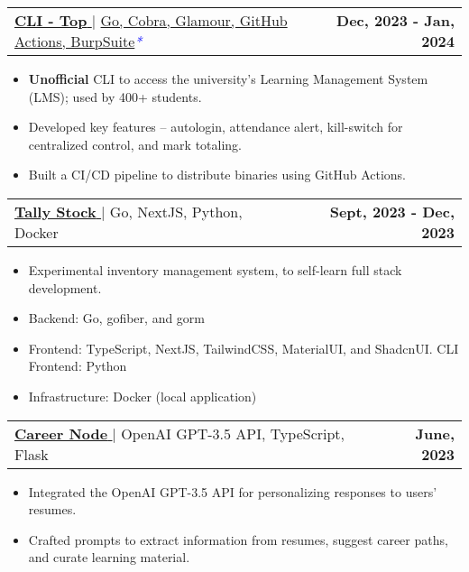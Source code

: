 \documentclass[letterpaper,11pt]{article}
\makeatletter
\newcommand{\uniformunderline}[1]{%
  \uline{\phantom{#1}}%
  \llap{\contour{white}{#1}}%
}
\newcommand{\resumeItem}[1]{
  \item\small{
    {#1 \vspace{-2pt}}
  }
}
\newcommand{\resumeProjectHeading}[2]{
    \item
    \begin{tabular*}{1.001\textwidth}{l@{\extracolsep{\fill}}r}
      \small#1 & \textbf{\small #2}\\
    \end{tabular*}\vspace{-7pt}
}
\newcommand{\resumeItemListStart}{\begin{itemize}}
\newcommand{\resumeItemListEnd}{\end{itemize}\vspace{-5pt}}
\makeatother
\begin{document}
        \resumeProjectHeading
            {\href{https://cli-top.acmvit.in}{\textbf{\large{CLI - Top}} \href{https://cli-top.acmvit.in}{\raisebox{-0.1\height}\faExternalLink }} $|$ \normalsize{\href{https://github.com/ACM-VIT/cli-top}{Go, Cobra, Glamour, GitHub Actions, BurpSuite}}\textcolor{blue}{\small{\textit{*}}}}{Dec, 2023 - Jan, 2024}
            \vspace{-11pt}
            \resumeItemListStart
                \resumeItem{\normalsize{\textbf{Unofficial} CLI to access the university's Learning Management System (LMS); used by 400+ students.}} 
                \resumeItem{\normalsize{Developed key features -- autologin, attendance alert, kill-switch for centralized control, and mark totaling.}}
                \resumeItem{\normalsize{Built a CI/CD pipeline to distribute binaries using GitHub Actions.}}
            \resumeItemListEnd
            \vspace{-15pt}
      
        \resumeProjectHeading
            {\href{https://github.com/saharshbhansali/TallyStock}{\textbf{\large{Tally Stock}} \href{https://github.com/saharshbhansali/TallyStock}{\raisebox{-0.1\height}\faExternalLink }} $|$ \normalsize{Go, NextJS, Python, Docker}}{Sept, 2023 - Dec, 2023}
            \vspace{-11pt}
            \resumeItemListStart
                \resumeItem{\normalsize{Experimental inventory management system, to self-learn full stack development.}} 
                \resumeItem{\normalsize{Backend: Go, gofiber, and gorm}} 
                \resumeItem{\normalsize{Frontend: TypeScript, NextJS, TailwindCSS, MaterialUI, and ShadcnUI. CLI Frontend: Python}}
                \resumeItem{\normalsize{Infrastructure: Docker (local application)}}
            \resumeItemListEnd
            \vspace{-15pt}

        \resumeProjectHeading
            {\href{https://github.com/kaushalrathi24/funtimeError}{\textbf{\large{Career Node}} \href{https://github.com/kaushalrathi24/funtimeError}{\raisebox{-0.1\height}\faExternalLink }} $|$ \normalsize{OpenAI GPT-3.5 API, TypeScript, Flask}}{June, 2023}
            \vspace{-11pt}
            \resumeItemListStart
                \resumeItem{\normalsize{Integrated the OpenAI GPT-3.5 API for personalizing responses to users' resumes.}} 
                \resumeItem{\normalsize{Crafted prompts to extract information from resumes, suggest career paths, and curate learning material.}} 
            \resumeItemListEnd 
            \vspace{-15pt}
\end{document}
